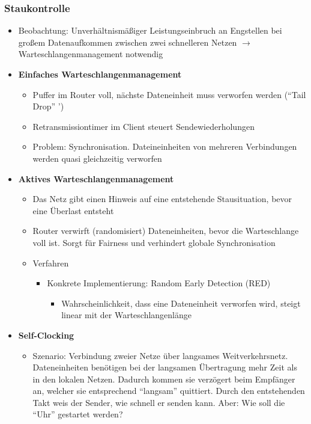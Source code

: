 \subsubsection{Staukontrolle}
\begin{itemize}
	\item Beobachtung: Unverhältnismäßiger Leistungseinbruch an Engstellen bei großem Datenaufkommen zwischen zwei schnelleren Netzen \(\rightarrow\) Warteschlangenmanagement notwendig
	\item \textbf{Einfaches Warteschlangenmanagement}
	\begin{itemize}
		\item Puffer im Router voll, nächste Dateneinheit muss verworfen werden ("`Tail Drop"'
		')
		\item Retransmissiontimer im Client steuert Sendewiederholungen
		\item Problem: Synchronisation. Dateineinheiten von mehreren Verbindungen werden quasi gleichzeitig verworfen
	\end{itemize}
	\item \textbf{Aktives Warteschlangenmanagement}
	\begin{itemize}
		\item Das Netz gibt einen Hinweis auf eine entstehende Stausituation, bevor eine Überlast entsteht
		\item Router verwirft (randomisiert) Dateneinheiten, bevor die Warteschlange voll ist. Sorgt für Fairness und verhindert globale Synchronisation
		\item Verfahren
		\begin{itemize}
			\item Konkrete Implementierung: Random Early Detection (RED)
			\begin{itemize}
				\item Wahrscheinlichkeit, dass eine Dateneinheit verworfen wird, steigt linear mit der Warteschlangenlänge
			\end{itemize}
		\end{itemize}
	\end{itemize}
	\item \textbf{Self-Clocking}
	\begin{itemize}
		\item Szenario: Verbindung zweier Netze über langsames Weitverkehrsnetz. Dateneinheiten benötigen bei der langsamen Übertragung mehr Zeit als in den lokalen Netzen. Dadurch kommen sie verzögert beim Empfänger an, welcher sie entsprechend "`langsam"' quittiert. Durch den entstehenden Takt weis der Sender, wie schnell er senden kann. Aber: Wie soll die "`Uhr"' gestartet werden?

\end{itemize}
\end{itemize}
